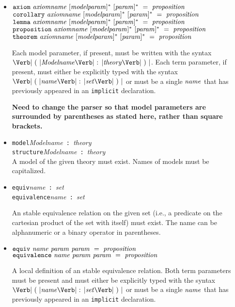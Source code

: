 \documentclass[11pt]{article}
\newcommand{\keywd}[1]{\mbox{\texttt{#1}}\xspace}
\newcommand{\AXIOM}{\keywd{axiom}}
\newcommand{\COROLLARY}{\keywd{corollary}}
\newcommand{\EQUIV}{\keywd{equiv}}
\newcommand{\EQUIVALENCE}{\keywd{equivalence}}
\newcommand{\IMPLICIT}{\keywd{implicit}}
\newcommand{\LEMMA}{\keywd{lemma}}
\newcommand{\MODEL}{\keywd{model}}
\newcommand{\PROPOSITION}{\keywd{proposition}}
\newcommand{\STRUCTURE}{\keywd{structure}}
\newcommand{\THEOREM}{\keywd{theorem}}
\newcommand{\metav}[1]{\mbox{\textit{#1}}\xspace}
\newcommand{\Ident}{\metav{name}}
\newcommand{\Identifier}{\Ident}
\newcommand{\MIdentifier}{\metav{Modelname}}
\newcommand{\Setexp}{\metav{set}}
\newcommand{\Proposition}{\metav{proposition}}
\newcommand{\Param}{\metav{param}}
\newcommand{\MParam}{\metav{modelparam}}
\newcommand{\Theoryexp}{\metav{theory}}
\newcommand{\COLON}{\mbox{\Verb| : |}}
\newcommand{\LPAREN}{\mbox{\Verb| ( |}}
\newcommand{\RPAREN}{\mbox{\Verb| ) |}}
\begin{document}
\begin{itemize}
\item $\AXIOM\ \metav{axiomname}\ [\MParam]^*\ [\Param]^*\ =\ \Proposition$\\
      $\COROLLARY\ \metav{axiomname}\ [\MParam]^*\ [\Param]^*\ =\ \Proposition$\\
      $\LEMMA\ \metav{axiomname}\ [\MParam]^*\ [\Param]^*\ =\ \Proposition$\\
      $\PROPOSITION\ \metav{axiomname}\ [\MParam]^*\ [\Param]^*\ =\ \Proposition$\\
      $\THEOREM\ \metav{axiomname}\ [\MParam]^*\ [\Param]^*\ =\ \Proposition$
      
      Each model parameter, if present, must be written
      with the syntax $\LPAREN \MIdentifier \COLON \Theoryexp \RPAREN$.
      Each term parameter, if present, must either be
      explicitly typed with the syntax $\LPAREN \Identifier \COLON 
      \Setexp \RPAREN$ or must be a single $\Identifier$ that has
      previously appeared in an \IMPLICIT declaration.

      \textbf{Need to change the parser so that model parameters are
      surrounded by parentheses as stated here, rather than 
      square brackets.}

\item \MODEL \MIdentifier \COLON \Theoryexp\\
      \STRUCTURE \MIdentifier \COLON \Theoryexp\\

      A model of the given theory must exist.  Names of models must be
      capitalized.

\item \EQUIV \Identifier \COLON \Setexp\\
      \EQUIVALENCE \Identifier \COLON \Setexp
  
  An stable equivalence relation on the given set (i.e., a predicate on the
  cartesian product of the set with itself) must exist.  The
  name can be alphanumeric or a binary operator in parentheses.

\item $\EQUIV\ \Identifier\ \Param\ \Param\ =\ \Proposition$\\
      $\EQUIVALENCE\ \Identifier\ \Param\ \Param\ =\ \Proposition$
 
  A local definition of an stable equivalence relation.  Both term parameters
  must be present and must either be explicitly typed with the syntax
  $\LPAREN \Identifier \COLON \Setexp \RPAREN$ or must be a single
  $\Identifier$ that has previously appeared in an \IMPLICIT
  declaration.  


\end{itemize}
\end{document}
